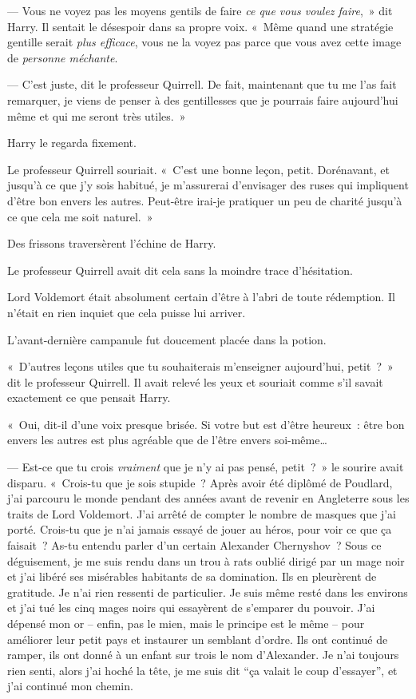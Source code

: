--- Vous ne voyez pas les moyens gentils de faire \emph{ce que vous voulez faire},~» dit Harry. Il sentait le désespoir dans sa propre voix. «~Même quand une stratégie gentille serait \emph{plus efficace}, vous ne la voyez pas parce que vous avez cette image de \emph{personne méchante}.

--- C'est juste, dit le professeur Quirrell. De fait, maintenant que tu me l'as fait remarquer, je viens de penser à des gentillesses que je pourrais faire aujourd'hui même et qui me seront très utiles.~»

Harry le regarda fixement.

Le professeur Quirrell souriait. «~C'est une bonne leçon, petit. Dorénavant, et jusqu'à ce que j'y sois habitué, je m'assurerai d'envisager des ruses qui impliquent d'être bon envers les autres. Peut-être irai-je pratiquer un peu de charité jusqu'à ce que cela me soit naturel.~»

Des frissons traversèrent l'échine de Harry.

Le professeur Quirrell avait dit cela sans la moindre trace d'hésitation.

Lord Voldemort était absolument certain d'être à l'abri de toute rédemption. Il n'était en rien inquiet que cela puisse lui arriver.

L'avant-dernière campanule fut doucement placée dans la potion.

«~D'autres leçons utiles que tu souhaiterais m'enseigner aujourd'hui, petit~?~» dit le professeur Quirrell. Il avait relevé les yeux et souriait comme s'il savait exactement ce que pensait Harry.

«~Oui, dit-il d'une voix presque brisée. Si votre but est d'être heureux~: être bon envers les autres est plus agréable que de l'être envers soi-même…

--- Est-ce que tu crois \emph{vraiment} que je n'y ai pas pensé, petit~?~» le sourire avait disparu. «~Crois-tu que je sois stupide~? Après avoir été diplômé de Poudlard, j'ai parcouru le monde pendant des années avant de revenir en Angleterre sous les traits de Lord Voldemort. J'ai arrêté de compter le nombre de masques que j'ai porté. Crois-tu que je n'ai jamais essayé de jouer au héros, pour voir ce que ça faisait~? As-tu entendu parler d'un certain Alexander Chernyshov~? Sous ce déguisement, je me suis rendu dans un trou à rats oublié dirigé par un mage noir et j'ai libéré ses misérables habitants de sa domination. Ils en pleurèrent de gratitude. Je n'ai rien ressenti de particulier. Je suis même resté dans les environs et j'ai tué les cinq mages noirs qui essayèrent de s'emparer du pouvoir. J'ai dépensé mon or -- enfin, pas le mien, mais le principe est le même -- pour améliorer leur petit pays et instaurer un semblant d'ordre. Ils ont continué de ramper, ils ont donné à un enfant sur trois le nom d'Alexander. Je n'ai toujours rien senti, alors j'ai hoché la tête, je me suis dit “ça valait le coup d'essayer”, et j'ai continué mon chemin.

